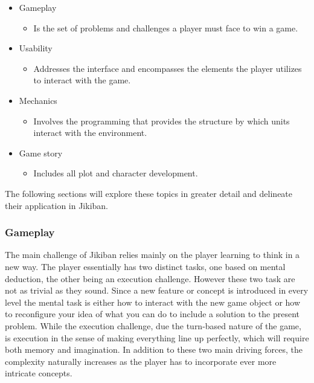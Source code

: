 \begin{itemize}

\item Gameplay
\begin{itemize}
\item Is the set of problems and challenges a player must face to win a game.
\end{itemize}

\item Usability
\begin{itemize}
\item Addresses the interface and encompasses the elements the player
  utilizes to interact with the game.
\end{itemize}

\item Mechanics
\begin{itemize}
\item Involves the programming that provides the structure by which
  units interact with the environment.
\end{itemize}

\item Game story
\begin{itemize}
\item Includes all plot and character development.
\end{itemize}
\end{itemize}

The following sections will explore these topics in greater detail and
delineate their application in Jikiban.

\subsubsection{Gameplay}
The main challenge of Jikiban relies mainly on the player learning to
think in a new way. The player essentially has two distinct tasks, one
based on mental deduction, the other being an execution challenge.
However these two task are not as trivial as they sound. Since a new
feature or concept is introduced in every level the mental task is
either how to interact with the new game object or how to reconfigure
your idea of what you can do to include a solution to the present
problem. While the execution challenge, due the turn-based nature of
the game, is execution in the sense of making everything line up
perfectly, which will require both memory and imagination. In addition
to these two main driving forces, the complexity naturally increases
as the player has to incorporate ever more intricate concepts.

